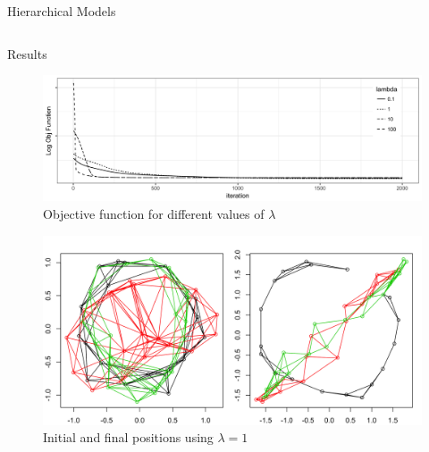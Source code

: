 \documentclass[final]{beamer}
\newlength{\onecolwid}
\newlength{\twocolwid}
\begin{document}
\begin{frame}[t]
\begin{columns}[t]
\begin{column}{\twocolwid}
\begin{columns}[t,totalwidth=\twocolwid]
\begin{column}{\onecolwid}
\begin{block}{Hierarchical Models}
\end{block}


\end{column} %

\end{columns} %




\begin{block}{Results}

\begin{figure}[h!]
   \centering
   \includegraphics[width=20in]{../R/plot_objective.png} %
   \caption{Objective function for different values of $\lambda$}
   \label{fig:obj_fun}
\end{figure}

\begin{figure}[h!]
   \centering
   \includegraphics[width=19in]{../R/plot_positions.png} %
   \caption{Initial and final positions using $\lambda=1$}
   \label{fig:positions}
\end{figure}



\end{block}
\end{column}
\end{columns}
\end{frame}
\end{document}
